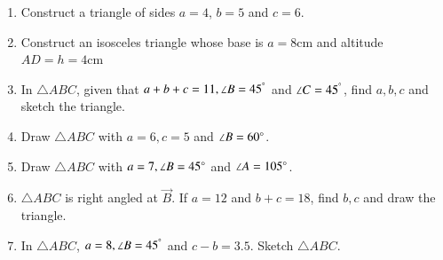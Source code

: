 \renewcommand{\theequation}{\theenumi}
\begin{enumerate}[label=\thesection.\arabic*.,ref=\thesection.\theenumi]

\item Construct a triangle of sides $a=4$, $b=5$  and $c=6$.  
\item Construct an isosceles triangle whose base is $a=8$cm and altitude $AD=h=4$cm 
\item In $\triangle ABC$,  given that $a+b+c = 11, \angle B = 45^{\degree}$ and $\angle C = 45^{\degree}$, 
find 
$a,b,c$ and sketch the triangle.
\item Draw $\triangle ABC$ with $a = 6, c = 5$ and $\angle B = 60 \degree$. 
\item Draw $\triangle ABC$ with $a = 7, \angle B = 45\degree$ and $\angle A = 105 \degree$. 
\item $\triangle ABC$ is right angled at $\vec{B}$.  If $a = 12$ and $b+c = 18$, find $b,c$ and draw the triangle.
\item In $\triangle ABC$,  $a = 8, \angle B = 45^{\degree}$ and $c-b = 3.5$.
Sketch $\triangle ABC$.


\end{enumerate}
